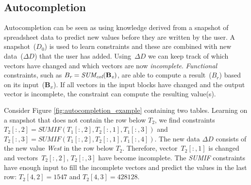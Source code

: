 \documentclass{IEEEtran}
\newcommand{\range}[3]{\ensuremath{#1[#2,#3]}}
\newcommand{\rangeall}{:}
\newcommand{\eccalc}[2]{\ensuremath{#1 = #2}}
\newcommand{\ecsumc}[2]{\eccalc{#1}{\textit{SUM\textsubscript{col}}(#2)}}
\newcommand{\ecsumif}[4]{\eccalc{#1}{\textit{SUMIF}(#2, #3, #4)}}
\newcommand{\sbs}{B}
\newcommand{\sbl}[1]{\ensuremath{\sbs_{\textit{#1}}}}
\theoremstyle{definition}
\begin{document}
\subsection{Autocompletion}
Autocompletion can be seen as using knowledge derived from a snapshot of spreadsheet data to predict new values before they are written by the user.
A snapshot~($D_0$) is used to learn constraints and these are combined with new data~($\Delta D$) that the user has added.
Using~$\Delta D$ we can keep track of which vectors have changed and which vectors are now \textit{incomplete}.
\textit{Functional} constraints, such as $\ecsumc{\sbl{r}}{\mathbf{\sbl{x}}}$, are able to compute a result~($\sbl{r}$) based on its input~($\mathbf{\sbl{x}}$).
If all vectors in the input blocks have changed and the output vector is incomplete, the constraint can compute the resulting value(s).

Consider Figure \ref{fig:autocompletion_example} containing two tables.
Learning on a snapshot that does not contain the row below $T_2$, we find constraints $\ecsumif{\range{T_2}{\rangeall}{2}}{\range{T_1}{\rangeall}{2}}{\range{T_2}{\rangeall}{1}}{\range{T_1}{\rangeall}{3}}$ and $\ecsumif{\range{T_2}{\rangeall}{3}}{\range{T_1}{\rangeall}{2}}{\range{T_2}{\rangeall}{1}}{\range{T_1}{\rangeall}{4}}$.
The new data $\Delta D$ consists of the new value \textit{West} in the row below $T_2$.
Therefore, vector~$\range{T_2}{:}{1}$ is changed and vectors~$\range{T_2}{:}{2}$, $\range{T_2}{:}{3}$ have become incomplete.
The \textit{SUMIF} constraints have enough input to fill the incomplete vectors and predict the values in the last row: $\range{T_2}{4}{2} = 1547$ and $\range{T_2}{4}{3} = 428128$.

\end{document}
